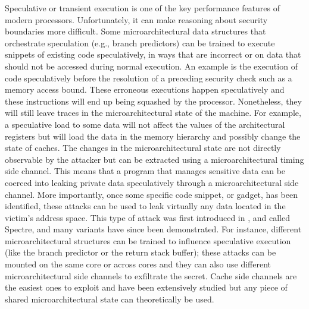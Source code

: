 Speculative or transient execution is one of the key performance features of modern processors.
Unfortunately, it can make reasoning about security boundaries more difficult.
Some microarchitectural data structures that orchestrate speculation (e.g., branch predictors) can be trained to execute snippets of existing code speculatively, in ways that are incorrect or on data that should not be accessed during normal execution.
An example is the execution of code speculatively before the resolution of a preceding security check such as a memory access bound.
These erroneous executions happen speculatively and these instructions will end up being squashed by the processor.
Nonetheless, they will still leave traces in the microarchitectural state of the machine.
For example, a speculative load to some data will not affect the values of the architectural registers but will load the data in the memory hierarchy and possibly change the state of caches.
The changes in the microarchitectural state are not directly observable by the attacker but can be extracted using a microarchitectural timing side channel.
This means that a program that manages sensitive data can be coerced into leaking private data speculatively through a microarchitectural side channel.
More importantly, once some specific code snippet, or gadget, has been identified, these attacks can be used to leak virtually any data located in the victim's address space.
This type of attack was first introduced in \cite{Kocher2018spectre}, and called Spectre, and many variants have since been demonstrated.
For instance, different microarchitectural structures can be trained to influence speculative execution (like the branch predictor or the return stack buffer); these attacks can be mounted on the same core or across cores and they can also use different microarchitectural side channels to exfiltrate the secret.
Cache side channels are the easiest ones to exploit and have been extensively studied but any piece of shared microarchitectural state can theoretically be used.